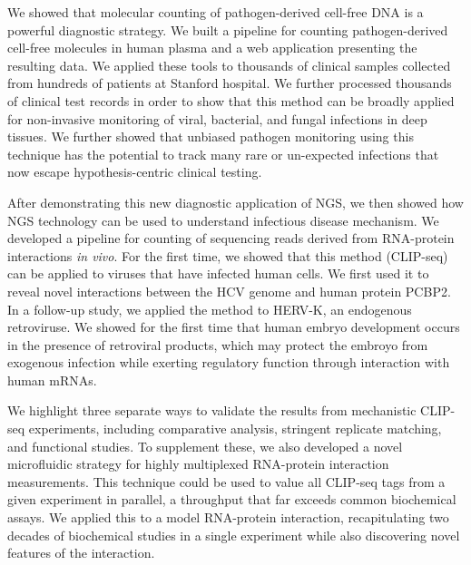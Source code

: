 We showed that molecular counting of pathogen-derived cell-free DNA is a powerful diagnostic strategy. We built a pipeline for counting pathogen-derived cell-free molecules in human plasma and a web application presenting the resulting data. We applied these tools to thousands of clinical samples collected from hundreds of patients at Stanford hospital. We further processed thousands of clinical test records in order to show that this method can be broadly applied for non-invasive monitoring of viral, bacterial, and fungal infections in deep tissues. We further showed that unbiased pathogen monitoring using this technique has the potential to track many rare or un-expected infections that now escape hypothesis-centric clinical testing.
   
After demonstrating this new diagnostic application of NGS, we then showed how NGS technology can be used to understand infectious disease mechanism. We developed a pipeline for counting of sequencing reads derived from RNA-protein interactions \emph{in vivo}. For the first time, we showed that this method (CLIP-seq) can be applied to viruses that have infected human cells. We first used it to reveal novel interactions between the HCV genome and human protein PCBP2. In a follow-up study, we applied the method to HERV-K, an endogenous retroviruse. We showed for the first time that human embryo development occurs in the presence of retroviral products, which may protect the embroyo from exogenous infection while exerting regulatory function through interaction with human mRNAs. 

We highlight three separate ways to validate the results from mechanistic CLIP-seq experiments, including comparative analysis, stringent replicate matching, and functional studies. To supplement these, we also developed a novel microfluidic strategy for highly multiplexed RNA-protein interaction measurements. This technique could be used to value all CLIP-seq tags from a given experiment in parallel, a throughput that far exceeds common biochemical assays. We applied this to a model RNA-protein interaction, recapitulating two decades of biochemical studies in a single experiment while also discovering novel features of the interaction.  
